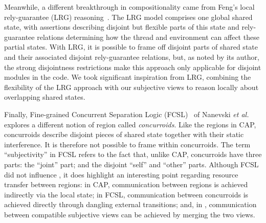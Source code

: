 Meanwhile, a different breakthrough in compositionality came from
Feng's local rely-guarantee (LRG) reasoning~\cite{lrg}. The LRG model
comprises one global shared state, with assertions describing
{disjoint} but flexible parts of this state and rely-guarantee
relations determining how the thread and environment can affect these
partial states. With LRG, it is possible to frame off disjoint parts of
shared state and their associated disjoint rely-guarantee relations, but, as noted
by its author, the strong disjointness restrictions make this approach
only applicable for disjoint modules in the code. We took significant
inspiration from LRG, combining the flexibility of the LRG approach
with our subjective views to reason locally about overlapping shared
states.




Finally, Fine-grained Concurrent Separation Logic
(FCSL)~\cite{scsl-esop14} of Nanevski {\em et al.} explores a
different notion of region called {\em concurroids}. Like the regions
in CAP, concurroids describe disjoint pieces of shared state together
with their static interference. It is therefore not possible to frame
within concurroids. The term ``subjectivity'' in FCSL refers to the
fact that, unlike CAP, concurroids have three parts: the ``joint''
part; and the disjoint ``self'' and ``other'' parts.  Although FCSL
did not influence \colosl, it does highlight an interesting point
regarding resource transfer between regions: in CAP, communication
between regions is achieved indirectly via the local state; in FCSL,
communication between concurroids is achieved directly through
dangling external transitions; and, in \colosl, communication between
compatible subjective views can be achieved by merging the two views.






